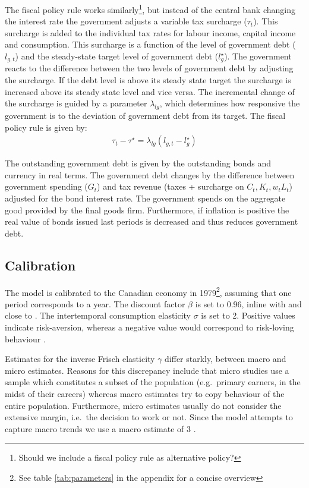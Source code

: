 \documentclass[12pt]{article}
\begin{document}
The fiscal policy rule works similarly\footnote{Should we include a fiscal policy rule as alternative policy?}, but instead of the central bank changing the interest rate the government adjusts a variable tax surcharge ($\tau_t$). This surcharge is added to the individual tax rates for labour income, capital income and consumption. This surcharge is a function of the level of government debt ($l_{g,t}$) and the steady-state target level of government debt ($l^{\star}_{g}$). The government reacts to the difference between the two levels of government debt by adjusting the surcharge. If the debt level is above its steady state target the surcharge is increased above its steady state level and vice versa. The incremental change of the surcharge is guided by a parameter $\lambda_{l g}$, which determines how responsive the government is to the deviation of government debt from its target. The fiscal policy rule is given by:
\begin{align}
    \tau_t - \tau^{\star} = \lambda_{l g} (l_{g,t} - l^{\star}_{g})
\end{align}

The outstanding government debt is given by the outstanding bonds and currency in real terms. The government debt changes by the difference between government spending ($G_t$) and tax revenue (taxes + surcharge on $C_t, K_t, w_tL_t$) adjusted for the bond interest rate. The government spends on the aggregate good provided by the final goods firm. Furthermore, if inflation is positive the real value of bonds issued last periods is decreased and thus reduces government debt.


\subsection*{Calibration}
The model is calibrated to the Canadian economy in 1979\footnote{See table \ref{tab:parameters} in the appendix for a concise overview}, assuming that one period corresponds to a year. 
The discount factor $\beta$ is set to 0.96, inline with \textcite{someOilDemandSupply2023} and close to \textcite{corriganToTEMIIIBank2021}. 
The intertemporal consumption elasticity $\sigma$ is set to 2. Positive values indicate risk-aversion, whereas a negative value would correspond to risk-loving behaviour
\parencite{thimmeIntertemporalSubstitutionConsumption2017}.

Estimates for the inverse Frisch elasticity $\gamma$ differ starkly, between macro and micro estimates. Reasons for this discrepancy
include that micro studies use a sample which constitutes a subset of the population (e.g.\ primary earners, in the midst of their careers) whereas macro 
estimates try to copy behaviour of the entire population. Furthermore, micro estimates usually do not consider the extensive margin, i.e.\ the decision 
to work or not. Since the model attempts to capture macro trends we use a macro estimate of 3 \parencite{petermanReconcilingMicroMacro2016}. 
\end{document}
